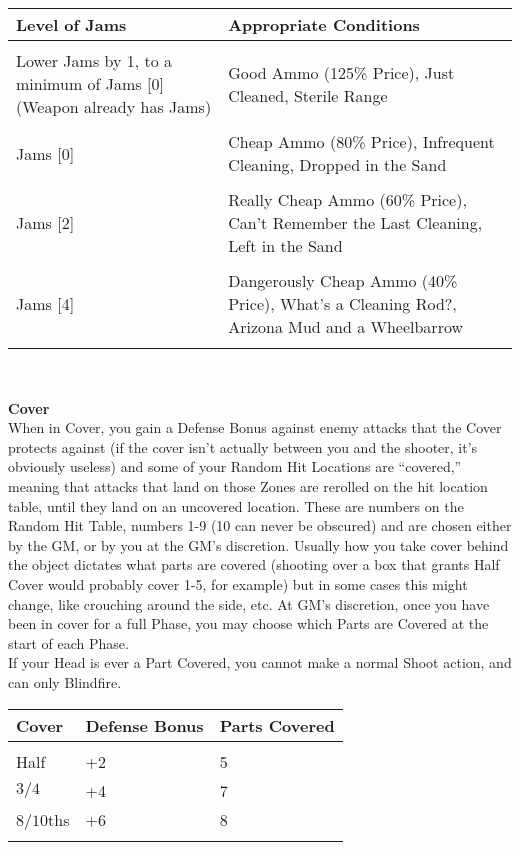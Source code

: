 \documentclass[a4paper, twocolumn, openany]{book}
\begin{document}
{{\centering
\begin{tabular}{p{3cm}p{3cm}}
Level of Jams														& Appropriate Conditions \\ \hline \\
Lower Jams by 1, to a minimum of Jams [0] (Weapon already has Jams)	& Good Ammo (125\% Price), Just Cleaned, Sterile Range \\ \\
Jams [0]															& Cheap Ammo (80\% Price), Infrequent Cleaning, Dropped in the Sand \\ \\
Jams [2]															& Really Cheap Ammo (60\% Price), Can’t Remember the Last Cleaning, Left in the Sand \\ \\
Jams [4]															& Dangerously Cheap Ammo (40\% Price), What’s a Cleaning Rod?, Arizona Mud and a Wheelbarrow \\
\\ \hline
\end{tabular}\\[\baselineskip] }

{\bfseries Cover\\}
When in Cover, you gain a Defense Bonus against enemy attacks that the Cover protects
against (if the cover isn’t actually between you and the shooter, it’s obviously useless) and some
of your Random Hit Locations are “covered,” meaning that attacks that land on those Zones are
rerolled on the hit location table, until they land on an uncovered location. These are numbers
on the Random Hit Table, numbers 1-9 (10 can never be obscured) and are chosen either by
the GM, or by you at the GM’s discretion. Usually how you take cover behind the object dictates
what parts are covered (shooting over a box that grants Half Cover would probably cover 1-5,
for example) but in some cases this might change, like crouching around the side, etc. At GM’s
discretion, once you have been in cover for a full Phase, you may choose which Parts are
Covered at the start of each Phase.\\
If your Head is ever a Part Covered, you cannot make a normal Shoot action, and can only
Blindfire.\\

{\centering
\begin{tabular}{lll}
Cover 		& Defense Bonus & Parts Covered \\ \hline \\
Half 		& +2 			& 5 \\
$3/4$ 		& +4 			& 7 \\
$8/10$ths 	& +6 			& 8 \\
\\ \hline
\end{tabular}\\[\baselineskip] }

}
\end{document}
